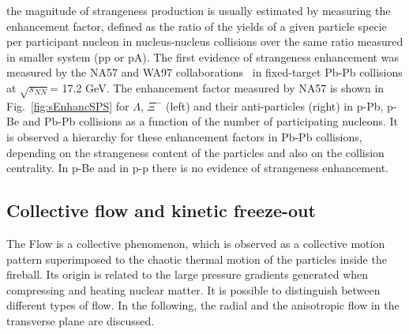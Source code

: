 the magnitude of strangeness production is usually estimated by measuring 
the enhancement factor, defined as the ratio of the yields of a given particle 
specie per participant nucleon in nucleus-nucleus collisions over the same 
ratio measured in smaller system (pp or pA). The first evidence of 
strangeness enhancement was measured by the NA57 and WA97 
collaborations~\cite{Sandor:2004bg} in fixed-target Pb-Pb collisions at 
$\sqrt{s_{NN}}$= 17.2 GeV. The enhancement factor measured by NA57 
is shown in Fig.~\ref{fig:sEnhancSPS} for $\Lambda$, $\Xi^-$ (left) and 
their anti-particles (right) in p-Pb, p-Be and Pb-Pb collisions as a function 
of the number of participating nucleons. It is observed a hierarchy for these 
enhancement factors in Pb-Pb collisions, depending on the strangeness
 content of the particles and also on the collision centrality. In p-Be and in 
 p-p there is no evidence of strangeness enhancement. 

\subsection{Collective flow and kinetic freeze-out}
The Flow is a collective phenomenon, which is observed as a collective 
motion pattern superimposed to the chaotic thermal motion of the 
particles inside the fireball. Its origin is related to the large pressure gradients 
generated when compressing and heating nuclear matter. It is possible 
to distinguish between different types of flow. In the following, 
the radial and the anisotropic flow in the transverse plane are discussed. 

